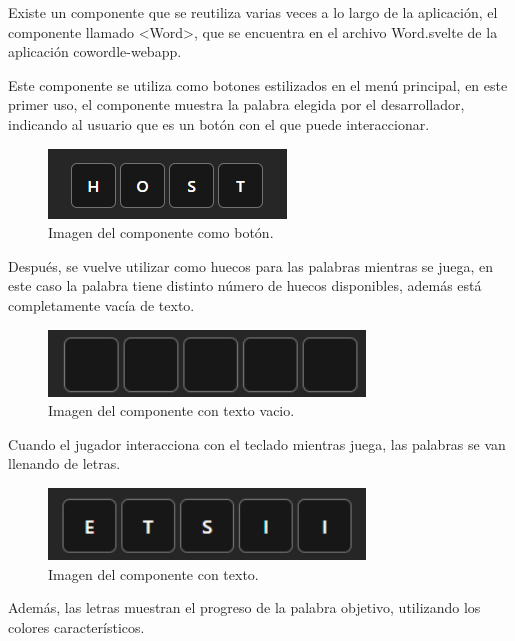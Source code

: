 Existe un componente que se reutiliza varias veces a lo largo de la aplicación, el componente llamado <Word>, que se encuentra en el archivo Word.svelte de la aplicación cowordle-webapp.

Este componente se utiliza como botones estilizados en el menú principal, en este primer uso, el componente muestra la palabra elegida por el desarrollador, indicando al usuario que es un botón con el que puede interaccionar.

\begin{figure}[H]
	\centering
	\includegraphics[clip=true]{images/reusing/host_component.png}
	\caption{Imagen del componente como botón.}
	\label{fig:comp_host_image}
\end{figure}

Después, se vuelve utilizar como huecos para las palabras mientras se juega, en este caso la palabra tiene distinto número de huecos disponibles, además está completamente vacía de texto.

\begin{figure}[H]
	\centering
	\includegraphics[clip=true, width=0.75\textwidth]{images/reusing/empty_component.png}
	\caption{Imagen del componente con texto vacio.}
	\label{fig:comp_empty}
\end{figure}


Cuando el jugador interacciona con el teclado mientras juega, las palabras se van llenando de letras.

\begin{figure}[H]
	\centering
	\includegraphics[clip=true, width=0.75\textwidth]{images/reusing/filled_component.png}
	\caption{Imagen del componente con texto.}
	\label{fig:comp_filled}
\end{figure}

Además, las letras muestran el progreso de la palabra objetivo, utilizando los colores característicos.

